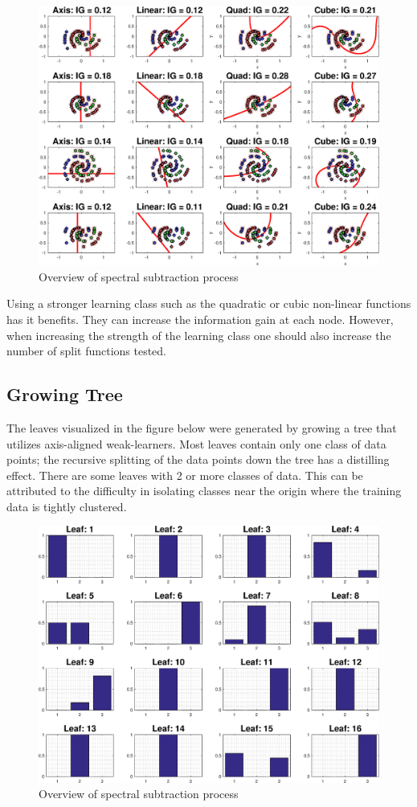 \documentclass[a4paper,pra,twocolumn,10pt,aps,longbibliography,nobalancelastpage]{revtex4-1}
\begin{document}
\begin{figure}[H]
	\centering
    \includegraphics[width=0.60\columnwidth]{split_function_visualitions_5}
    \caption{Overview of spectral subtraction process}
    \label{fig:learners_3}
\end{figure}

Using a stronger learning class such as the quadratic or cubic non-linear functions has it benefits. They can increase the information gain at each node. However, when increasing the strength of the learning class one should also increase the number of split functions tested.

\subsection{Growing Tree}
The leaves visualized in the figure below were generated by growing a tree that utilizes axis-aligned weak-learners. Most leaves contain only one class of data points; the recursive splitting of the data points down the tree has a distilling effect. There are some leaves with 2 or more classes of data. This can be attributed to the difficulty in isolating classes near the origin where the training data is tightly clustered.

\begin{figure}[H]
	\centering
    \includegraphics[width=0.60\columnwidth]{leaf_node_distributions_1}
    \caption{Overview of spectral subtraction process}
    \label{fig:leaf_nodes}
\end{figure}
\end{document}
